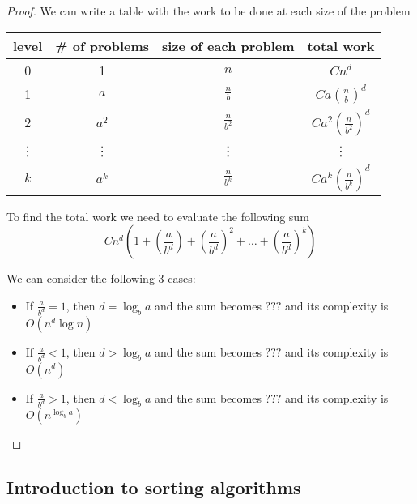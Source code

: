\documentclass[10pt]{extarticle}
\begin{document}
\begin{proof}
    We can write a table with the work to be done at each size of the problem

    \begin{center}
        \begin{tabular}{ |c|c|c|c| }
            \hline
            level  & \# of problems & size of each problem & total work                         \\
            \hline
            0      & 1              & $n$                  & $Cn^d$                             \\
            1      & $a$            & $\frac{n}{b}$        & $Ca\left(\frac{n}{b}\right)^d$     \\
            2      & $a^2$          & $\frac{n}{b^2}$      & $Ca^2\left(\frac{n}{b^2}\right)^d$ \\
            \vdots & \vdots         & \vdots               & \vdots                             \\
            $k$    & $a^k$          & $\frac{n}{b^k}$      & $Ca^k\left(\frac{n}{b^k}\right)^d$ \\
            \hline
        \end{tabular}
    \end{center}

    To find the total work we need to evaluate the following sum
    $$
        Cn^d\left(1+\left(\frac{a}{b^d}\right)+\left(\frac{a}{b^d}\right)^2+\dots+\left(\frac{a}{b^d}\right)^k\right)
    $$

    We can consider the following 3 cases:
    \begin{itemize}
        \item If $\frac{a}{b^d} = 1$, then $d = \log_b a$ and the sum becomes $ ??? $ and its complexity is $O(n^d \log n)$
        \item If $\frac{a}{b^d} < 1$, then $d > \log_b a$ and the sum becomes $ ??? $ and its complexity is $O(n^d)$
        \item If $\frac{a}{b^d} > 1$, then $d < \log_b a$ and the sum becomes $ ??? $ and its complexity is $O(n^{\log_b a})$
    \end{itemize}

\end{proof}

\subsection{Introduction to sorting algorithms}
\end{document}
